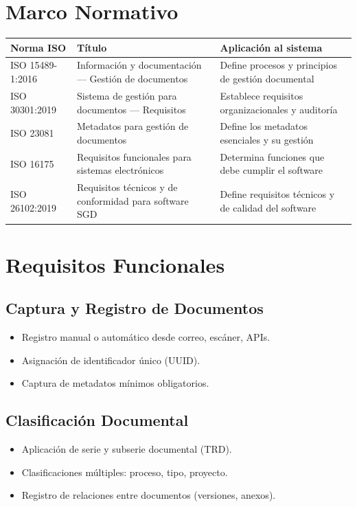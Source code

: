 \documentclass[12pt,a4paper]{article}
\begin{document}
\section{Marco Normativo}
\begin{longtable}{p{3cm}p{7cm}p{5cm}}
\toprule
\textbf{Norma ISO} & \textbf{Título} & \textbf{Aplicación al sistema} \\
\midrule
ISO 15489-1:2016 & Información y documentación — Gestión de documentos & Define procesos y principios de gestión documental \\
ISO 30301:2019 & Sistema de gestión para documentos — Requisitos & Establece requisitos organizacionales y auditoría \\
ISO 23081 & Metadatos para gestión de documentos & Define los metadatos esenciales y su gestión \\
ISO 16175 & Requisitos funcionales para sistemas electrónicos & Determina funciones que debe cumplir el software \\
ISO 26102:2019 & Requisitos técnicos y de conformidad para software SGD & Define requisitos técnicos y de calidad del software \\
\bottomrule
\end{longtable}

\section{Requisitos Funcionales}

\subsection{Captura y Registro de Documentos}
\begin{itemize}
    \item Registro manual o automático desde correo, escáner, APIs.
    \item Asignación de identificador único (UUID).
    \item Captura de metadatos mínimos obligatorios.
\end{itemize}

\subsection{Clasificación Documental}
\begin{itemize}
    \item Aplicación de serie y subserie documental (TRD).
    \item Clasificaciones múltiples: proceso, tipo, proyecto.
    \item Registro de relaciones entre documentos (versiones, anexos).
\end{itemize}
\end{document}

